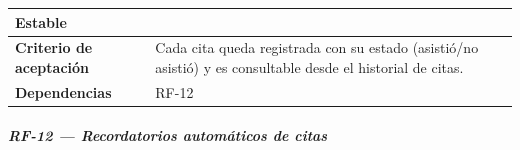 \documentclass[
]{article}
\begin{document}
{\begin{longtable}[]{|
  >{\raggedright\arraybackslash}p{}|
  >{\raggedright\arraybackslash}p{}|}
\begin{minipage}[t]{\linewidth}
Estable
\end{minipage} \\
\hline
\textbf{Criterio de aceptación} &
\begin{minipage}[t]{\linewidth}\raggedright
Cada cita queda registrada con su estado (asistió/no asistió) y es consultable desde el historial de citas.
\end{minipage} \\
\hline
\textbf{Dependencias} & \begin{minipage}[t]{\linewidth}\raggedright
RF-12
\end{minipage} \\
\hline
\end{longtable}
}

\subparagraph{RF-12 --- Recordatorios automáticos de citas}\label{rf-12-recordatorios-autom-ticos-de-citas}
\end{document}
